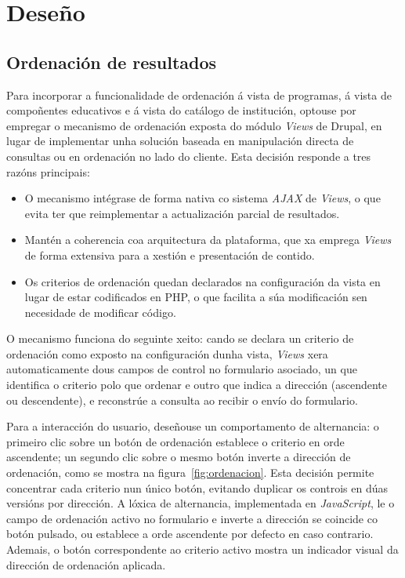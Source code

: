 \documentclass[%
    a4paper,               %
    twoside,               %
    10pt,                  %
]{article}                 %
\begin{document}
\section{Deseño}

\subsection{Ordenación de resultados}
\label{sec:diseno_ordenacion}

Para incorporar a funcionalidade de ordenación á vista de programas, á vista de compoñentes educativos e á vista do catálogo de institución, optouse por empregar o mecanismo de ordenación exposta do módulo \textit{Views} de Drupal, en lugar de implementar unha solución baseada en manipulación directa de consultas ou en ordenación no lado do cliente. Esta decisión responde a tres razóns principais:
\begin{itemize}
    \item O mecanismo intégrase de forma nativa co sistema \textit{AJAX} de \textit{Views}, o que evita ter que reimplementar a actualización parcial de resultados.
    \item Mantén a coherencia coa arquitectura da plataforma, que xa emprega \textit{Views} de forma extensiva para a xestión e presentación de contido.
    \item Os criterios de ordenación quedan declarados na configuración da vista en lugar de estar codificados en PHP, o que facilita a súa modificación sen necesidade de modificar código.
\end{itemize}

O mecanismo funciona do seguinte xeito: cando se declara un criterio de ordenación como exposto na configuración dunha vista, \textit{Views} xera automaticamente dous campos de control no formulario asociado, un que identifica o criterio polo que ordenar e outro que indica a dirección (ascendente ou descendente), e reconstrúe a consulta ao recibir o envío do formulario.

Para a interacción do usuario, deseñouse un comportamento de alternancia: o primeiro clic sobre un botón de ordenación establece o criterio en orde ascendente; un segundo clic sobre o mesmo botón inverte a dirección de ordenación, como se mostra na figura~\ref{fig:ordenacion}. Esta decisión permite concentrar cada criterio nun único botón, evitando duplicar os controis en dúas versións por dirección. A lóxica de alternancia, implementada en \textit{JavaScript}, le o campo de ordenación activo no formulario e inverte a dirección se coincide co botón pulsado, ou establece a orde ascendente por defecto en caso contrario. Ademais, o botón correspondente ao criterio activo mostra un indicador visual da dirección de ordenación aplicada.
\end{document}
